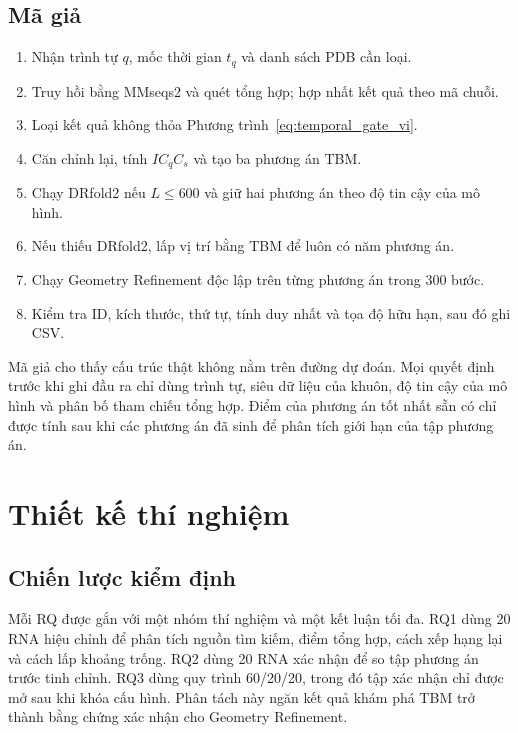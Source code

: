 \documentclass[12pt,a4paper,oneside]{report}
\begin{document}
\section{Mã giả}

\begin{enumerate}
  \item Nhận trình tự $q$, mốc thời gian $t_q$ và danh sách PDB cần loại.
  \item Truy hồi bằng MMseqs2 và quét tổng hợp; hợp nhất kết quả theo mã chuỗi.
  \item Loại kết quả không thỏa Phương trình~\ref{eq:temporal_gate_vi}.
  \item Căn chỉnh lại, tính $I C_q C_s$ và tạo ba phương án TBM.
  \item Chạy DRfold2 nếu $L\leq600$ và giữ hai phương án theo độ tin cậy của mô hình.
  \item Nếu thiếu DRfold2, lấp vị trí bằng TBM để luôn có năm phương án.
  \item Chạy Geometry Refinement độc lập trên từng phương án trong 300 bước.
  \item Kiểm tra ID, kích thước, thứ tự, tính duy nhất và tọa độ hữu hạn, sau đó ghi CSV.
\end{enumerate}

Mã giả cho thấy cấu trúc thật không nằm trên đường dự đoán. Mọi quyết định trước khi ghi
đầu ra chỉ dùng trình tự, siêu dữ liệu của khuôn, độ tin cậy của mô hình và phân bố tham
chiếu tổng hợp. Điểm của phương án tốt nhất sẵn có chỉ được tính sau khi các phương án đã
sinh để phân tích giới hạn của tập phương án.

\chapter{Thiết kế thí nghiệm}
\label{chap:experiment_vi}

\section{Chiến lược kiểm định}

Mỗi RQ được gắn với một nhóm thí nghiệm và một kết luận tối đa. RQ1 dùng 20 RNA hiệu chỉnh
để phân tích nguồn tìm kiếm, điểm tổng hợp, cách xếp hạng lại và cách lấp khoảng trống.
RQ2 dùng 20 RNA xác nhận để so tập phương án trước tinh chỉnh. RQ3 dùng quy trình
60/20/20, trong đó tập xác nhận
chỉ được mở sau khi khóa cấu hình. Phân tách này ngăn kết quả khám phá TBM trở thành bằng
chứng xác nhận cho Geometry Refinement.
\end{document}
